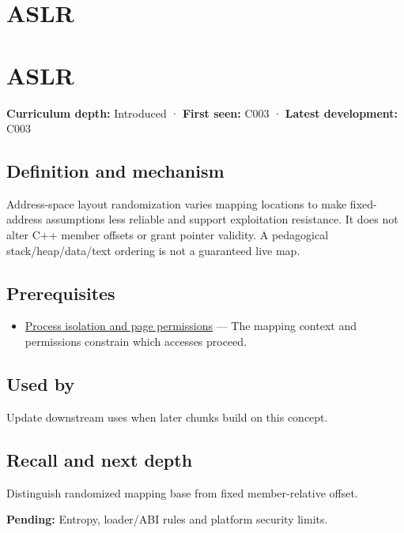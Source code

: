 \hypertarget{appendix-78cb248c8355}{}
\section*{ASLR}
\section{ASLR}\label{aslr}

\textbf{Curriculum depth:} Introduced · \textbf{First seen:} C003 · \textbf{Latest development:} C003

\subsection{Definition and mechanism}\label{definition-and-mechanism}

Address-space layout randomization varies mapping locations to make fixed-address assumptions less reliable and support exploitation resistance. It does not alter C++ member offsets or grant pointer validity. A pedagogical stack/heap/data/text ordering is not a guaranteed live map.

\subsection{Prerequisites}\label{prerequisites}

\begin{itemize}
\tightlist
\item
  \hyperref[appendix-c2a9ad1e2b49]{Process isolation and page permissions} --- The mapping context and permissions constrain which accesses proceed.
\end{itemize}

\subsection{Used by}\label{used-by}

Update downstream uses when later chunks build on this concept.

\subsection{Recall and next depth}\label{recall-and-next-depth}

Distinguish randomized mapping base from fixed member-relative offset.

\textbf{Pending:} Entropy, loader/ABI rules and platform security limits.

